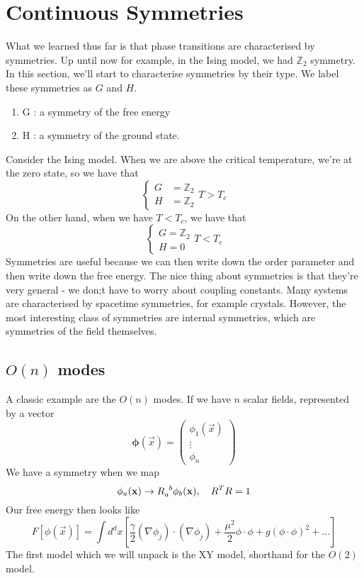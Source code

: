 \section{Continuous Symmetries} 

What we learned thus far is that 
phase transitions are characterised by symmetries. 
Up until now for example, in the Ising model, we had $ \mathbb{ Z}_ 2  $  symmetry. 
In this section, we'll start to characterise symmetries 
by their type. We label these symmetries as $ G $ and $ H $. 
\begin{enumerate}
	\item G : a symmetry of the free energy 
	\item H : a symmetry of the ground state. 
\end{enumerate} 
Consider the Ising model. 
When we are above the critical temperature, we're 
at the zero state, so we have that 
\[
 \begin{cases}
	 G & = \mathbb{ Z} _ 2 \\
	 H & = \mathbb{ Z} _ 2 
 \end{cases}
 T > T _ c 
\] On the other hand, when we 
have $ T < T _ c$, we have that 
\[
 \begin{cases}
	 G = \mathbb{ Z} _ 2 \\
	 H = 0 
 \end{cases}
 T <  T _ c 
\]
Symmetries are useful because we can then write down the order parameter
and then write down the free energy. The nice
thing about symmetries is that they're very general  - we don;t have
to worry about coupling constants. 
Many systems are characterised by spacetime symmetries, for example crystals. 
However, the most interesting class of symmetries 
are internal symmetries, which are symmetries of the field themselves. 

\subsection{$ O ( n ) $ modes} 
A classic example are the 
$ O ( n ) $ modes. If we have $ n $ scalar fields, 
represented by a vector 
\[
	\mathbf{ \phi } ( \vec{x} )  = \begin{pmatrix}  
	\phi _ 1 ( \vec{x} ) \\ \vdots \\ \phi _ n \end{pmatrix} 
\] We have a symmetry when we map 
\[
	\phi _ a ( \vec{x} ) \to R \indices{_ a ^ b } \phi _ b ( \vec{x} ) , \quad R ^ T  R = 1 
\]  Our free energy then looks like 
\[
	F [ \phi ( \vec{x} ) ] = 
	\int d ^ d x \left[ 
	\frac{ \gamma }{ 2 } ( \nabla \phi _ j ) \cdot  ( \nabla \phi _ j ) +  \frac{\mu ^ 2 }{ 2}
\phi \cdot  \phi + g ( \phi \cdot  \phi ) ^ 2 + \dots \right] 
\] 
The first model which we will unpack is the XY model, shorthand 
for the $ O ( 2) $ model. 

